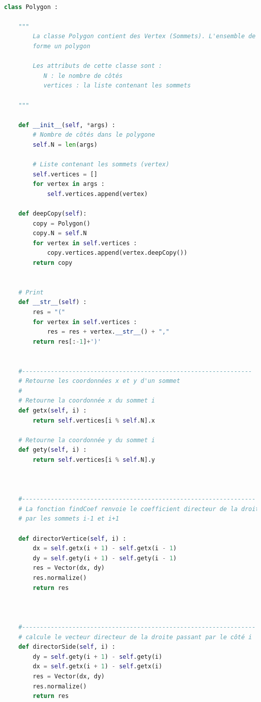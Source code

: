 \documentclass[a4paper,reqno]{article}
\begin{document}
\begin{lstlisting}[language=Python,frame=single,caption=Création de la classe Polygon]

class Polygon :

    """
        La classe Polygon contient des Vertex (Sommets). L'ensemble de ces sommets
        forme un polygon

        Les attributs de cette classe sont :
           N : le nombre de côtés
           vertices : la liste contenant les sommets

    """

    def __init__(self, *args) :
        # Nombre de côtés dans le polygone
        self.N = len(args)

        # Liste contenant les sommets (vertex)
        self.vertices = []
        for vertex in args :
            self.vertices.append(vertex)

    def deepCopy(self):
        copy = Polygon()
        copy.N = self.N
        for vertex in self.vertices :
            copy.vertices.append(vertex.deepCopy())
        return copy


    # Print
    def __str__(self) :
        res = "("
        for vertex in self.vertices :
            res = res + vertex.__str__() + ","
        return res[:-1]+')'


    #----------------------------------------------------------------
    # Retourne les coordonnées x et y d'un sommet
    #
    # Retourne la coordonnée x du sommet i
    def getx(self, i) :
        return self.vertices[i % self.N].x

    # Retourne la coordonnée y du sommet i
    def gety(self, i) :
        return self.vertices[i % self.N].y



    #-----------------------------------------------------------------
    # La fonction findCoef renvoie le coefficient directeur de la droite passant
    # par les sommets i-1 et i+1

    def directorVertice(self, i) :
        dx = self.getx(i + 1) - self.getx(i - 1)
        dy = self.gety(i + 1) - self.gety(i - 1)
        res = Vector(dx, dy)
        res.normalize()
        return res



    #-----------------------------------------------------------------
    # calcule le vecteur directeur de la droite passant par le côté i
    def directorSide(self, i) :
        dy = self.gety(i + 1) - self.gety(i)
        dx = self.getx(i + 1) - self.getx(i)
        res = Vector(dx, dy)
        res.normalize()
        return res



\end{lstlisting}
\end{document}
